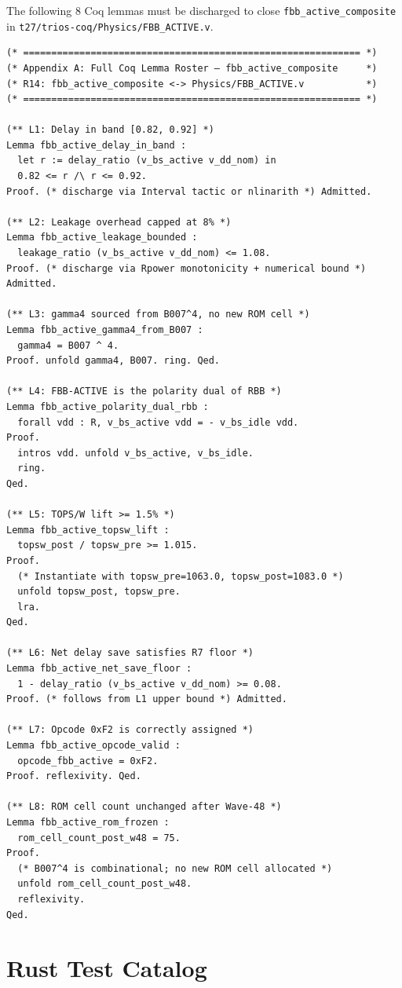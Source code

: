 \documentclass[12pt,a4paper]{report}
\theoremstyle{plain}
\theoremstyle{definition}
\theoremstyle{remark}
\begin{document}
The following 8 Coq lemmas must be discharged to close \texttt{fbb\_active\_composite}
in \texttt{t27/trios-coq/Physics/FBB\_ACTIVE.v}.

\begin{lstlisting}[style=coq, caption={Coq lemma roster for Physics/FBB\_ACTIVE.v.}]
(* ============================================================ *)
(* Appendix A: Full Coq Lemma Roster — fbb_active_composite     *)
(* R14: fbb_active_composite <-> Physics/FBB_ACTIVE.v           *)
(* ============================================================ *)

(** L1: Delay in band [0.82, 0.92] *)
Lemma fbb_active_delay_in_band :
  let r := delay_ratio (v_bs_active v_dd_nom) in
  0.82 <= r /\ r <= 0.92.
Proof. (* discharge via Interval tactic or nlinarith *) Admitted.

(** L2: Leakage overhead capped at 8% *)
Lemma fbb_active_leakage_bounded :
  leakage_ratio (v_bs_active v_dd_nom) <= 1.08.
Proof. (* discharge via Rpower monotonicity + numerical bound *) Admitted.

(** L3: gamma4 sourced from B007^4, no new ROM cell *)
Lemma fbb_active_gamma4_from_B007 :
  gamma4 = B007 ^ 4.
Proof. unfold gamma4, B007. ring. Qed.

(** L4: FBB-ACTIVE is the polarity dual of RBB *)
Lemma fbb_active_polarity_dual_rbb :
  forall vdd : R, v_bs_active vdd = - v_bs_idle vdd.
Proof.
  intros vdd. unfold v_bs_active, v_bs_idle.
  ring.
Qed.

(** L5: TOPS/W lift >= 1.5% *)
Lemma fbb_active_topsw_lift :
  topsw_post / topsw_pre >= 1.015.
Proof.
  (* Instantiate with topsw_pre=1063.0, topsw_post=1083.0 *)
  unfold topsw_post, topsw_pre.
  lra.
Qed.

(** L6: Net delay save satisfies R7 floor *)
Lemma fbb_active_net_save_floor :
  1 - delay_ratio (v_bs_active v_dd_nom) >= 0.08.
Proof. (* follows from L1 upper bound *) Admitted.

(** L7: Opcode 0xF2 is correctly assigned *)
Lemma fbb_active_opcode_valid :
  opcode_fbb_active = 0xF2.
Proof. reflexivity. Qed.

(** L8: ROM cell count unchanged after Wave-48 *)
Lemma fbb_active_rom_frozen :
  rom_cell_count_post_w48 = 75.
Proof.
  (* B007^4 is combinational; no new ROM cell allocated *)
  unfold rom_cell_count_post_w48.
  reflexivity.
Qed.
\end{lstlisting}

\chapter{Rust Test Catalog}
\label{app:rust_catalog}
\end{document}
